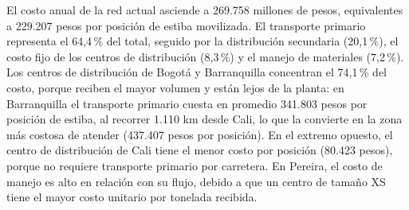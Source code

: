 \documentclass[fleqn, 11pt,letterpaper]{article}
\begin{document}
\begin{table}[H]
\centering
\caption{Costo anual de operación de la red actual por centro de distribución (millones de COP)}
\label{tab:costo_actual}
\small
\setlength{\tabcolsep}{4pt}
\renewcommand{\arraystretch}{1.2}
\end{table}

El costo anual de la red actual asciende a 269.758 millones de pesos, equivalentes a 229.207 pesos por posición de estiba movilizada. El transporte primario representa el 64,4\,\% del total, seguido por la distribución secundaria (20,1\,\%), el costo fijo de los centros de distribución (8,3\,\%) y el manejo de materiales (7,2\,\%). Los centros de distribución de Bogotá y Barranquilla concentran el 74,1\,\% del costo, porque reciben el mayor volumen y están lejos de la planta: en Barranquilla el transporte primario cuesta en promedio 341.803 pesos por posición de estiba, al recorrer 1.110 km desde Cali, lo que la convierte en la zona más costosa de atender (437.407 pesos por posición). En el extremo opuesto, el centro de distribución de Cali tiene el menor costo por posición (80.423 pesos), porque no requiere transporte primario por carretera. En Pereira, el costo de manejo es alto en relación con su flujo, debido a que un centro de tamaño XS tiene el mayor costo unitario por tonelada recibida.
\end{document}
